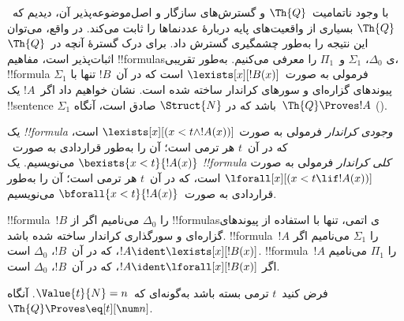 \documentclass[../../../include/open-logic-section]{subfiles}
\begin{document}

با وجود ناتمامیت~$\Th{Q}$ و گسترش‌های سازگار و اصل‌موضوعه‌پذیر آن،
دیدیم که~$\Th{Q}$ بسیاری از واقعیت‌های پایه دربارهٔ عددنماها را ثابت
می‌کند. در واقع، می‌توان این نتیجه را به‌طور چشمگیری گسترش داد. برای
درک گسترهٔ آنچه در~$\Th{Q}$ اثبات‌پذیر است، مفاهیم !!{formula}sی
$\Delta_0$، $\Sigma_1$ و~$\Pi_1$ را معرفی می‌کنیم. به‌طور تقریبی،
!!{formula} $\Sigma_1$ فرمولی به صورت~$\lexists[x][!B(x)]$ است که
در آن~$!B$ تنها با پیوندهای گزاره‌ای و سورهای کراندار ساخته شده است.
نشان خواهیم داد اگر~$!A$ یک !!{sentence} $\Sigma_1$ باشد که در
$\Struct{N}$ صادق است، آنگاه~$\Th{Q} \Proves !A$
().

\begin{defn}
یک \emph{!!{formula} وجودی کراندار} فرمولی به صورت
$\lexists[x][(x < t \land !A(x))]$ است، که در آن~$t$ هر ترمی است؛
آن را به‌طور قراردادی به صورت~$\bexists{x < t}{!A(x)}$ می‌نویسیم.
%
یک \emph{!!{formula} کلی کراندار} فرمولی به صورت
$\lforall[x][(x < t \lif !A(x))]$ است، که در آن~$t$ هر ترمی است؛
آن را به‌طور قراردادی به صورت~$\bforall{x < t}{!A(x)}$ می‌نویسیم.
\end{defn}

\begin{defn}
!!{formula}~$!B$ را $\Delta_0$ می‌نامیم اگر از !!{formula}sی اتمی،
تنها با استفاده از پیوندهای گزاره‌ای و سورگذاری کراندار ساخته شده باشد.
%
!!{formula}~$!A$ را $\Sigma_1$ می‌نامیم اگر
$!A \ident \lexists[x][!B(x)]$، که در آن~$!B$، $\Delta_0$ است.
%
!!{formula}~$!A$ را $\Pi_1$ می‌نامیم اگر
$!A \ident \lforall[x][!B(x)]$، که در آن~$!B$، $\Delta_0$ است.
\end{defn}

\begin{lem}
 فرض کنید~$t$ ترمی بسته باشد به‌گونه‌ای
که~$\Value{t}{N} = n$. آنگاه~$\Th{Q} \Proves \eq[t][\num n]$.
\end{lem}
\end{document}
